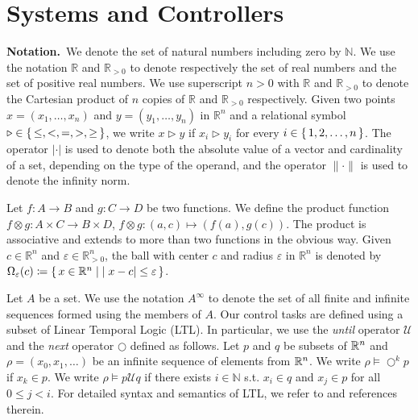 
\section{Systems and Controllers}

\smallskip
\noindent\textbf{Notation.}\
We denote the set of natural numbers including zero by $\mathbb N$.
We use the notation $\mathbb{R}$ and $\mathbb{R}_{>0}$ to denote respectively the set of real numbers and the set of positive real numbers.
We use superscript $n>0$ with $\mathbb{R}$ and $\mathbb{R}_{>0}$ to denote the Cartesian product of $n$ copies of $\mathbb{R}$ and $\mathbb{R}_{>0}$ respectively.
Given two points $x=(x_1,\ldots, x_n)$ and $y=(y_1,\ldots, y_n)$ in $ \mathbb{R}^n$
and a relational symbol $\triangleright\in \set{\leq, <, = , >, \geq}$, we write $x\triangleright y$ if $x_i\triangleright y_i$ for every $i\in\set{1,2,\ldots,n}$.
The operator $|\cdot |$ is used to denote both the absolute value of a vector and cardinality of a set, depending on the type of the operand, and the operator $\| \cdot \|$ is used to denote the infinity norm.  

Let $f\colon A\to B$ and $g\colon C\to D$ be two functions.
We define the product function $f\otimes g\colon A\times C\to B\times D $, $f\otimes g \colon (a,c)\mapsto (f(a),g(c))$.
The product is associative and extends to more than two functions in the obvious way.
%
Given $c\in \mathbb{R}^n$ and $\varepsilon\in \mathbb{R}_{>0}^{n}$, the ball with center $c$ and radius $\varepsilon$ in $\mathbb{R}^n$ is denoted by 
$\Omega_\varepsilon(c)\coloneqq \set{x \in \mathbb{R}^n \mid  |x-c|\leq \varepsilon }$.

Let $A$ be a set.
We use the notation $A^\infty$ to denote the set of all finite and infinite sequences formed using the members of $A$. Our control tasks are defined using a subset of Linear Temporal Logic (LTL). 
In particular, we use the \emph{until} operator $\mathcal{U}$ and the \emph{next} operator $\bigcirc$ defined as follows. 
Let $p$ and $q$ be subsets of $\mathbb{R}^n$ and $\rho=(x_0,x_1,\dots)$ be an infinite sequence of elements from $\mathbb{R}^n$. 
We write $\rho\models\bigcirc^k p$ if $x_k\in p$. We write $\rho\models p\mathcal{U}q$ if there exists 
$i\in\mathbb{N}$ s.t. $x_i\in q$ and $x_j\in p$ for all $0\leq j<i$. 
For detailed syntax and semantics of LTL, we refer to \cite{baier2008principles} and references therein.

